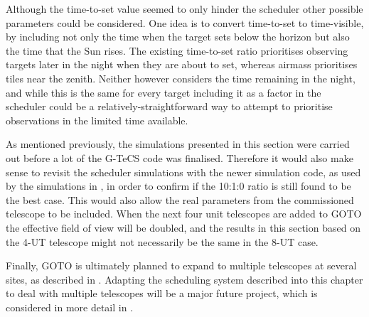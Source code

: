 \begin{colsection}
\begin{colsection}
Although the time-to-set value seemed to only hinder the scheduler other possible parameters could be considered. One idea is to convert time-to-set to time-visible, by including not only the time when the target sets below the horizon but also the time that the Sun rises. The existing time-to-set ratio prioritises observing targets later in the night when they are about to set, whereas airmass prioritises tiles near the zenith. Neither however considers the time remaining in the night, and while this is the same for every target including it as a factor in the scheduler could be a relatively-straightforward way to attempt to prioritise observations in the limited time available.

As mentioned previously, the simulations presented in this section were carried out before a lot of the G-TeCS code was finalised. Therefore it would also make sense to revisit the scheduler simulations with the newer simulation code, as used by the simulations in , in order to confirm if the 10:1:0 ratio is still found to be the best case. This would also allow the real parameters from the commissioned telescope to be included. When the next four unit telescopes are added to GOTO the effective field of view will be doubled, and the results in this section based on the 4-UT telescope might not necessarily be the same in the 8-UT case.

Finally, GOTO is ultimately planned to expand to multiple telescopes at several sites, as described in . Adapting the scheduling system described into this chapter to deal with multiple telescopes will be a major future project, which is considered in more detail in .

\end{colsection}


\end{colsection}

